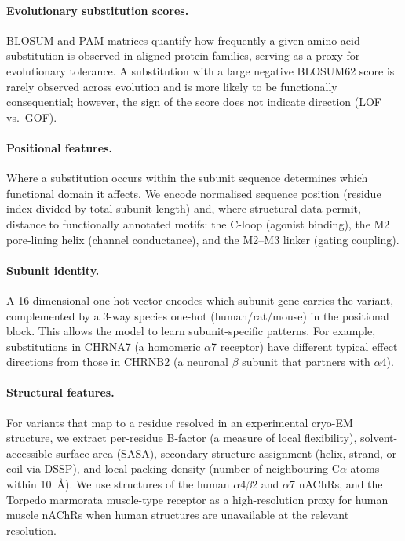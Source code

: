 \documentclass{ws-procs11x85}
\begin{document}
\paragraph{Evolutionary substitution scores.}
BLOSUM and PAM matrices quantify how frequently a given amino-acid
substitution is observed in aligned protein families, serving as a
proxy for evolutionary tolerance. A substitution with a large negative
BLOSUM62 score is rarely observed across evolution and is more likely
to be functionally consequential; however, the sign of the
score does not indicate direction (LOF vs.\ GOF).

\paragraph{Positional features.}
Where a substitution occurs within the subunit sequence determines
which functional domain it affects. We encode normalised sequence
position (residue index divided by total subunit length) and,
where structural data permit, distance to functionally annotated
motifs: the C-loop (agonist binding), the M2 pore-lining helix
(channel conductance), and the M2–M3 linker (gating coupling).

\paragraph{Subunit identity.}
A 16-dimensional one-hot vector encodes which subunit gene carries the
variant, complemented by a 3-way species one-hot (human/rat/mouse) in
the positional block. This allows the model to learn subunit-specific
patterns. For example, substitutions in CHRNA7 (a homomeric
$\alpha$7 receptor) have different typical effect directions from those
in CHRNB2 (a neuronal $\beta$ subunit that partners with $\alpha$4).

\paragraph{Structural features.}
For variants that map to a residue resolved in an experimental cryo-EM
structure, we extract per-residue B-factor (a measure of local
flexibility), solvent-accessible surface area (SASA), secondary
structure assignment (helix, strand, or coil via DSSP), and local
packing density (number of neighbouring C$\alpha$ atoms within
10~\AA). We use structures of the human $\alpha$4$\beta$2 and
$\alpha$7 nAChRs, and the Torpedo marmorata muscle-type receptor
as a high-resolution proxy for human muscle nAChRs when human
structures are unavailable at the relevant resolution.
\end{document}
